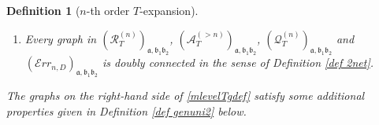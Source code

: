 \documentclass{article}
\newcommand{\1}{\mathds{1}}
\numberwithin{equation}{section}
\newcommand{\al}{\alpha}
\newcommand{\fa}{{\mathfrak a}}
\newcommand{\fb}{{\mathfrak b}}
\renewcommand{\cal}{\mathcal}
\renewcommand{\leq}{\leqslant}
\renewcommand{\le}{\leq}
\newcommand{\E}{\mathbb{E}}
\newcommand{\N}{\mathbb{N}}
\theoremstyle{plain} %
\newtheorem{definition}[theorem]{Definition}
\theoremstyle{remark}
\newtheorem{remark}[theorem]{Remark}
\newcommand{\cor}{\color{red}}
\newcommand{\Sdeltak}{{\Sigma}_{T,k}}
\newcommand{\Selek}{{\mathcal E}}
\newcommand{\PT}{\mathcal R_T}
\newcommand{\PTn}{\mathcal R_T^{(n)}}
\newcommand{\PTk}{{\mathcal R_{T,k}}}
\newcommand{\QTn}{\mathcal Q_T^{(n)}}
\newcommand{\QTk}{{\mathcal Q_{T,k}}}
\newcommand{\ATn}{\mathcal A_T^{(>n)}}
\newcommand{\Err}{{\mathcal Err}}
\begin{document}
\begin{definition} [$n$-th order $T$-expansion]
\begin{enumerate}
		\item Every graph in $(\PTn)_{\fa,\fb_1\fb_2}$, $(\ATn)_{\fa,\fb_1\fb_2}$, $(\QTn)_{\fa,\fb_1\fb_2}$ and $(\Err_{n,D})_{\fa,\fb_1\fb_2}$ is doubly connected in the sense of Definition \ref{def 2net}. 
		
		
		
	\end{enumerate}
	The graphs on the right-hand side of \eqref{mlevelTgdef} satisfy some additional properties given in Definition \ref{def genuni2} below. %
\end{definition}


%

\end{document}
